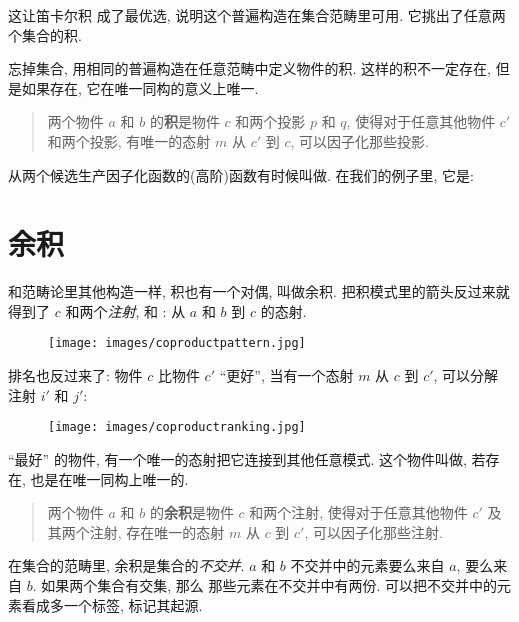 这让笛卡尔积  成了最优选, 说明这个普遍构造在集合范畴里可用. 它挑出了任意两个集合的积.

忘掉集合, 用相同的普遍构造在任意范畴中定义物件的积. 这样的积不一定存在, 但是如果存在, 它在唯一同构的意义上唯一.

\begin{quote}
  两个物件 $a$ 和 $b$ 的\textbf{积}是物件 $c$ 和两个投影 $p$ 和 $q$, 使得对于任意其他物件 $c'$ 和两个投影,
  有唯一的态射 $m$ 从 $c'$ 到 $c$, 可以因子化那些投影.
\end{quote}

\noindent
从两个候选生产因子化函数的(高阶)函数有时候叫做. 在我们的例子里, 它是:


\section{余积}

和范畴论里其他构造一样, 积也有一个对偶, 叫做余积. 把积模式里的箭头反过来就得到了 $c$ 和两个\emph{注射},  和 :
从 $a$ 和 $b$ 到 $c$ 的态射.


\begin{figure}[H]
  \centering
  \texttt{[image: images/coproductpattern.jpg]}
\end{figure}

\noindent
排名也反过来了: 物件 $c$ 比物件 $c'$ ``更好'', 当有一个态射 $m$ 从 $c$ 到 $c'$, 可以分解注射 $i'$ 和 $j'$:


\begin{figure}[H]
  \centering
  \texttt{[image: images/coproductranking.jpg]}
\end{figure}

\noindent
``最好'' 的物件, 有一个唯一的态射把它连接到其他任意模式. 这个物件叫做, 若存在, 也是在唯一同构上唯一的.

\begin{quote}
  两个物件 $a$ 和 $b$ 的\textbf{余积}是物件 $c$ 和两个注射, 使得对于任意其他物件 $c'$ 及其两个注射, 存在唯一的态射
  $m$ 从 $c$ 到 $c'$, 可以因子化那些注射.
\end{quote}

\noindent
在集合的范畴里, 余积是集合的\emph{不交并}. $a$ 和 $b$ 不交并中的元素要么来自 $a$, 要么来自 $b$. 如果两个集合有交集, 那么
那些元素在不交并中有两份. 可以把不交并中的元素看成多一个标签, 标记其起源.

